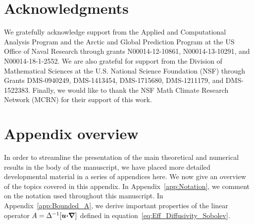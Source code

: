 \documentclass[english,12pt,jmp,graphicx]{revtex4-1}
\newcommand{\vecu}{\boldsymbol{u}}
\newcommand{\secref}[1]{Section~\ref{#1}}
\newcommand{\appref}[1]{Appendix~\ref{#1}}
\newcommand{\bnabla}{\mbox{\boldmath${\nabla}$}}
\newcommand{\bcdot}{\mbox{\boldmath${\cdot}$}}
\newcommand{\Sg}{\mathfrak{S}}
\newcommand{\Ag}{\mathfrak{A}}
\newcommand{\Dg}{\mathfrak{D}}
\begin{document}
\section{Acknowledgments}
We gratefully acknowledge support from the Applied and Computational Analysis Program
and the Arctic and Global Prediction Program  
at the US Office of Naval Research through grants 
N00014-12-10861,
N00014-13-10291, 
and N00014-18-1-2552. 
We are also grateful for support from the Division
of Mathematical Sciences at the U.S. National
Science Foundation (NSF) through Grants
DMS-0940249, 
DMS-1413454,
DMS-1715680, 
DMS-1211179, and
DMS-1522383.
Finally, we would like to thank the NSF Math
Climate Research Network (MCRN) for their support of this work.

\appendix

\section{Appendix overview}\label{app:Appendix_overview}
%
In order to streamline the presentation of the main theoretical and
numerical results in the body of the manuscript, we have placed more
detailed developmental material in a series of appendices here. We
now give an overview of the topics covered in this appendix. In
\appref{app:Notation}, we comment on the notation used throughout 
this manuscript. In \appref{app:Bounded_A}, we derive
important properties of the linear operator
$A=\Delta^{-1}[\vecu\bcdot\bnabla]$ defined in
equation~\eqref{eq:Eff_Diffusivity_Sobolev}.




\end{document}
